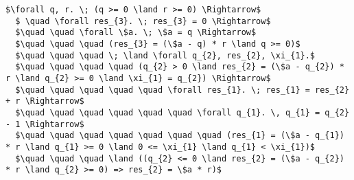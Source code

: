 \begin{lstlisting}[mathescape=true]
  $\forall q, r. \; (q >= 0 \land r >= 0) \Rightarrow$
  $ \quad \forall res_{3}. \; res_{3} = 0 \Rightarrow$
  $\quad \quad \forall \$a. \; \$a = q \Rightarrow$
  $\quad \quad \quad (res_{3} = (\$a - q) * r \land q >= 0)$
  $\quad \quad \quad \; \land \forall q_{2}, res_{2}, \xi_{1}.$
  $\quad \quad \quad \quad (q_{2} > 0 \land res_{2} = (\$a - q_{2}) * r \land q_{2} >= 0 \land \xi_{1} = q_{2}) \Rightarrow$
  $\quad \quad \quad \quad \quad \forall res_{1}. \; res_{1} = res_{2} + r \Rightarrow$
  $\quad \quad \quad \quad \quad \quad \forall q_{1}. \, q_{1} = q_{2} - 1 \Rightarrow$
  $\quad \quad \quad \quad \quad \quad \quad (res_{1} = (\$a - q_{1}) * r \land q_{1} >= 0 \land 0 <= \xi_{1} \land q_{1} < \xi_{1})$
  $\quad \quad \quad \land ((q_{2} <= 0 \land res_{2} = (\$a - q_{2}) * r \land q_{2} >= 0) => res_{2} = \$a * r)$
  \end{lstlisting}
